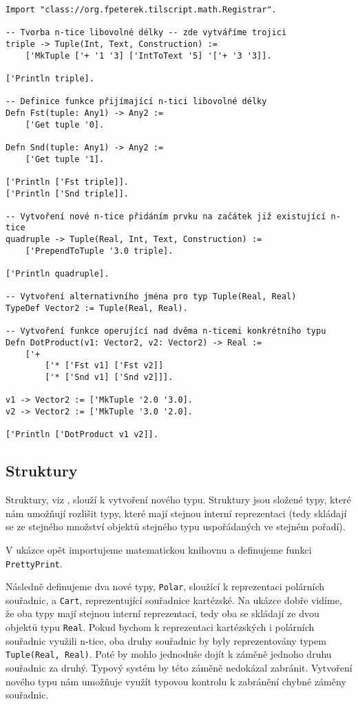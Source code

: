 \begin{lstlisting}[caption={Práce s n-ticemi}, language=Tilscript]
Import "class://org.fpeterek.tilscript.math.Registrar".

-- Tvorba n-tice libovolné délky -- zde vytváříme trojici
triple -> Tuple(Int, Text, Construction) :=
    ['MkTuple ['+ '1 '3] ['IntToText '5] '['+ '3 '3]].

['Println triple].

-- Definice funkce přijímající n-tici libovolné délky
Defn Fst(tuple: Any1) -> Any2 :=
    ['Get tuple '0].

Defn Snd(tuple: Any1) -> Any2 :=
    ['Get tuple '1].

['Println ['Fst triple]].
['Println ['Snd triple]].

-- Vytvoření nové n-tice přidáním prvku na začátek již existující n-tice
quadruple -> Tuple(Real, Int, Text, Construction) :=
    ['PrependToTuple '3.0 triple].

['Println quadruple].

-- Vytvoření alternativního jména pro typ Tuple(Real, Real)
TypeDef Vector2 := Tuple(Real, Real).

-- Vytvoření funkce operující nad dvěma n-ticemi konkrétního typu
Defn DotProduct(v1: Vector2, v2: Vector2) -> Real :=
    ['+
        ['* ['Fst v1] ['Fst v2]]
        ['* ['Snd v1] ['Snd v2]]].

v1 -> Vector2 := ['MkTuple '2.0 '3.0].
v2 -> Vector2 := ['MkTuple '3.0 '2.0].

['Println ['DotProduct v1 v2]].
\end{lstlisting}

\subsection{Struktury}

Struktury, viz , slouží k vytvoření nového typu. Struktury jsou složené typy, které
nám umožňují rozlišit typy, které mají stejnou interní reprezentaci (tedy skládají se ze stejného
množství objektů stejného typu uspořádaných ve stejném pořadí).

V ukázce opět importujeme matematickou knihovnu a definujeme funkci \lstinline{PrettyPrint}.

Následně definujeme dva nové typy, \lstinline{Polar}, sloužící k reprezentaci polárních souřadnic,
a \lstinline{Cart}, reprezentující souřadnice kartézské. Na ukázce dobře vidíme, že oba typy mají
stejnou interní reprezentaci, tedy oba se skládají ze dvou objektů typu \lstinline{Real}. Pokud
bychom k reprezentaci kartézských i polárních souřadnic využili n-tice, oba druhy souřadnic by byly
reprezentovány typem \lstinline{Tuple(Real, Real)}. Poté by mohlo jednoduše dojít k záměně jednoho
druhu souřadnic za druhý. Typový systém by této záměně nedokázal zabránit. Vytvoření nového typu
nám umožňuje využít typovou kontrolu k zabránění chybné záměny souřadnic.

